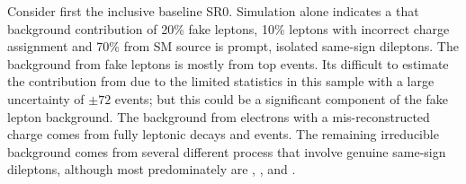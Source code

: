 Consider first the inclusive baseline SR0. Simulation alone indicates a that
background contribution of 20\% fake leptons, 10\% leptons with incorrect
charge assignment and 70\% from SM source is prompt, isolated same-sign
dileptons. The background from fake leptons is mostly from top events. Its
difficult to estimate the contribution from \Wj due to the limited statistics
in this sample with a large uncertainty of $\pm72$ events; but this could be
a significant component of the fake lepton background. The background from
electrons with a mis-reconstructed charge comes from fully leptonic \ttbar
decays and \DY events. The remaining irreducible background comes from several
different process that involve genuine same-sign dileptons, although most
predominately are \ttW, \WZ, and \qqWW.
\begin{table}[!hbt]
\begin{center}
\caption[Low \pt baseline yields and predictions with no b-tagged jets requirement (Signal Region 0)]
{\label{tab:yield_excl_lpt_sr0}\footnotesize{
\excllptnamerZERO
\excllptcutsrZERO
\exclcaption
}
}
\end{center} 
\resizebox{0.65\textwidth}{!}{\begin{minipage}{\textwidth}
 
\end{minipage} 
}
\end{table}
\clearpage
\begin{table}[!hbt]
\begin{center}
\caption[Low \pt baseline yields and predictions with exactly one b-tagged jet (Signal Region 10)]
{\label{tab:yield_excl_lpt_sr10}\footnotesize{
\excllptnamerONEZERO
\excllptcutsrONEZERO
\exclcaption
}
}
\end{center} 
\resizebox{0.65\textwidth}{!}{\begin{minipage}{\textwidth}
 
\end{minipage} 
}
\end{table}
\clearpage
\begin{table}[!hbt]
\begin{center}
\caption[Low \pt baseline yields and predictions with two or more b-tagged jets (Signal Region 20)]
{\label{tab:yield_excl_lpt_sr20}\footnotesize{
\excllptnamerTWOZERO
\excllptcutsrTWOZERO
\exclcaption
}
}
\end{center} 
\resizebox{0.67\textwidth}{!}{\begin{minipage}{\textwidth}
 
\end{minipage} 
}
\end{table}

